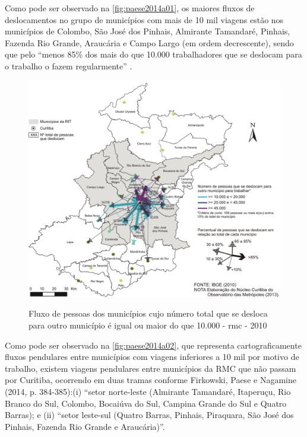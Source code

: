 	Como pode ser observado na \autoref{fig:paese2014a01}, os maiores fluxos de deslocamentos no grupo de municípios com mais de 10 mil viagens estão nos municípios de Colombo, São José dos Pinhais, Almirante Tamandaré, Pinhais, Fazenda Rio Grande, Araucária e Campo Largo (em ordem decrescente), sendo que pelo ``menos 85\% dos mais do que 10.000 trabalhadores que se deslocam para o trabalho o fazem regularmente'' \cite[p. 384]{paese2014a}.
	
	\begin{figure}
		\centering
		\caption{Fluxo de pessoas dos municípios cujo número total que se desloca para outro município é igual ou maior do que 10.000 - \gls{rmc} - 2010}
		\includegraphics[width=0.7\linewidth]{img/paese2014a_01}
		\label{fig:paese2014a01}
	\end{figure}

	Como pode ser observado na \autoref{fig:paese2014a02}, que representa cartograficamente fluxos pendulares entre municípios com viagens inferiores a 10 mil por motivo de trabalho, existem viagens pendulares entre municípios da RMC que não passam por Curitiba, ocorrendo em duas tramas conforme Firkowski, Paese e Nagamine (2014, p. 384-385):(i) “setor norte-leste (Almirante Tamandaré, Itaperuçu, Rio Branco do Sul, Colombo, Bocaiúva do Sul, Campina Grande do Sul e Quatro Barras); e (ii) ``setor leste-sul (Quatro Barras, Pinhais, Piraquara, São José dos Pinhais, Fazenda Rio Grande e Araucária)''.

